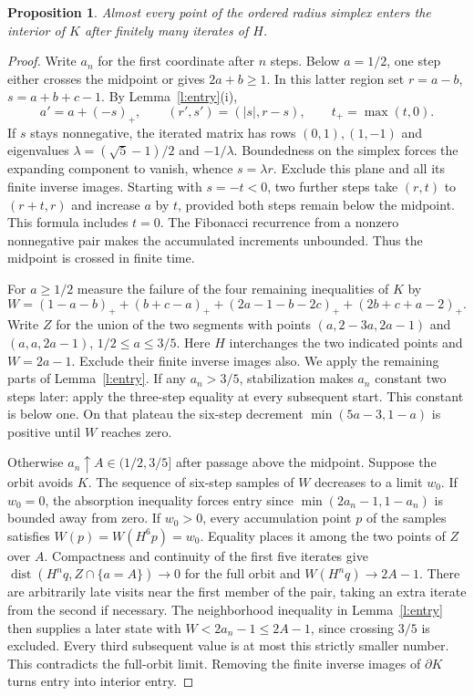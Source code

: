 \documentclass[11pt,reqno]{amsart}
\newtheorem{proposition}[theorem]{Proposition}
\begin{document}
\begin{proposition}\label{pr:entry}
Almost every point of the ordered radius simplex enters the interior of
$K$ after finitely many iterates of $H$.
\end{proposition}
\begin{proof}
Write $a_n$ for the first coordinate after $n$ steps. Below $a=1/2$,
one step either crosses the midpoint or gives $2a+b\ge1$. In this latter
region set $r=a-b$, $s=a+b+c-1$. By Lemma~\ref{l:entry}(i),
\[
 a'=a+(-s)_+,\qquad (r',s')=(|s|,r-s),\qquad t_+=\max(t,0).
\]
If $s$ stays nonnegative, the iterated matrix has rows $(0,1),(1,-1)$
and eigenvalues $\lambda=(\sqrt5-1)/2$ and $-1/\lambda$. Boundedness
on the simplex forces the expanding component to vanish, whence
$s=\lambda r$. Exclude this plane and all its finite inverse images.
Starting with $s=-t<0$, two further steps take $(r,t)$ to $(r+t,r)$
and increase $a$ by $t$, provided both steps remain below the midpoint.
This formula includes $t=0$. The Fibonacci recurrence from a nonzero
nonnegative pair makes the accumulated increments unbounded. Thus the
midpoint is crossed in finite time.

For $a\ge1/2$ measure the failure of the four remaining inequalities of $K$ by
\[
 W=(1-a-b)_++(b+c-a)_++(2a-1-b-2c)_++(2b+c+a-2)_+ .
\]
Write $Z$ for the union of the two segments with points $(a,2-3a,2a-1)$
and $(a,a,2a-1)$, $1/2\le a\le3/5$. Here $H$ interchanges the two indicated
points and $W=2a-1$. Exclude their finite inverse images also. We apply the
remaining parts of Lemma~\ref{l:entry}. If any $a_n>3/5$, stabilization
makes $a_n$ constant two steps later: apply the three-step equality at every
subsequent start. This constant is below one. On that plateau the six-step
decrement $\min(5a-3,1-a)$ is positive until $W$ reaches zero.

Otherwise $a_n\uparrow A\in(1/2,3/5]$ after passage above the midpoint.
Suppose the orbit avoids $K$. The sequence of six-step samples of $W$
decreases to a limit $w_0$. If $w_0=0$, the absorption inequality forces
entry since $\min(2a_n-1,1-a_n)$ is bounded away from zero. If $w_0>0$,
every accumulation point $p$ of the samples satisfies
$W(p)=W(H^6p)=w_0$. Equality places it among the two points of $Z$
over $A$. Compactness and continuity of the first five iterates give
$\operatorname{dist}(H^nq,Z\cap\{a=A\})\to0$ for the full orbit and
$W(H^nq)\to2A-1$. There are arbitrarily late visits near the first member
of the pair, taking an extra iterate from the second if necessary. The
neighborhood inequality in Lemma~\ref{l:entry} then supplies a later
state with $W<2a_n-1\le2A-1$, since crossing $3/5$ is excluded. Every third
subsequent value is at most this strictly smaller number. This contradicts
the full-orbit limit. Removing the finite inverse images of $\partial K$
turns entry into interior entry.
\end{proof}
\end{document}
